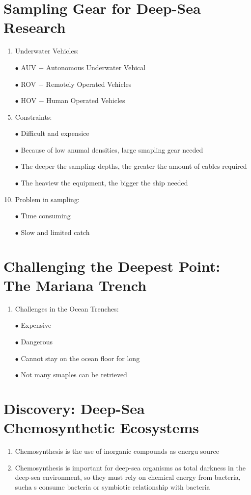 \documentclass{report}
\begin{document}
\section{Sampling Gear for Deep-Sea Research}
\begin{enumerate}
    \item Underwater Vehicles:
    \item [$\bullet$]AUV $-$ Autonomous Underwater Vehical
    \item [$\bullet$]ROV $-$ Remotely Operated Vehicles
    \item [$\bullet$]HOV $-$ Human Operated Vehicles
    \item Constraints:
    \item [$\bullet$]Difficult and expensice 
    \item [$\bullet$]Because of low anumal densities, large smapling gear needed 
    \item [$\bullet$]The deeper the sampling depths, the greater the amount of cables required 
    \item [$\bullet$]The heaview the equipment, the bigger the ship needed 
    \item Problem in sampling:
    \item [$\bullet$]Time consuming
    \item [$\bullet$]Slow and limited catch
\end{enumerate}


\section{Challenging the Deepest Point: The Mariana Trench}
\begin{enumerate}
    \item Challenges in the Ocean Trenches:
    \item [$\bullet$]Expensive
    \item [$\bullet$]Dangerous
    \item [$\bullet$]Cannot stay on the ocean floor for long
    \item [$\bullet$]Not many smaples can be retrieved 
\end{enumerate}


\section{Discovery: Deep-Sea Chemosynthetic Ecosystems}
\begin{enumerate}
    \item Chemosynthesis is the use of inorganic compounds as energu source 
    \item Chemosynthesis is important for deep-sea organisms as total darkness in the deep-sea environment, so they must rely on chemical energy from bacteria, sucha s consume bacteria or symbiotic relationship with bacteria 
\end{enumerate}
\end{document}
